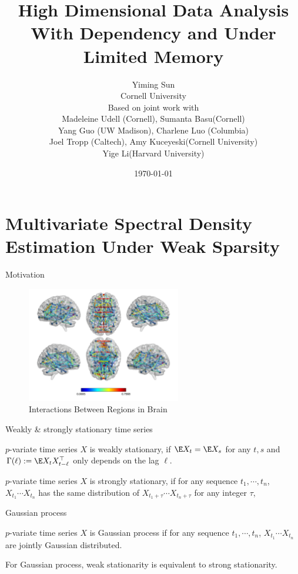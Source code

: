 \documentclass[handout,xcolor={usenames,dvipsnames}]{beamer}
\title{High Dimensional Data Analysis With Dependency and Under Limited Memory}
\date{\today} %
\author[Yiming Sun Cornell. \textit{}]{%
Yiming Sun\\[1ex]
{Cornell University}\\
\vspace{.4in}
Based on joint work with \\
Madeleine Udell (Cornell), Sumanta Basu(Cornell)\\
Yang Guo (UW Madison),  Charlene Luo (Columbia)\\
Joel Tropp (Caltech), Amy Kuceyeski(Cornell University)\\
Yige Li(Harvard University)}
\begin{document}
\begin{frame}
\titlepage
\end{frame}

\section{Multivariate Spectral Density Estimation Under Weak Sparsity}
\begin{frame}{Motivation}
\begin{figure}
\centering 
\includegraphics[width=0.6\textwidth]{al_c.jpg}
\caption{Interactions Between Regions in Brain}
\end{figure}
\end{frame}

\begin{frame}{Weakly \& strongly stationary time series}
\begin{definition}
$p$-variate time series $X$ is weakly stationary, if $\E X_t = \E X_s$ for any $t, s$ and $\Gamma(\ell) := \E X_t X^\top_{t-\ell}$ only depends on the lag $\ell$.  
\end{definition} 
\begin{definition}
$p$-variate time series $X$ is strongly stationary, if for any sequence $t_1, \cdots, t_n$,  $X_{t_1} \cdots X_{t_n}$ has the same distribution of $X_{t_1+\tau} \cdots X_{t_n+\tau}$ for any integer $\tau$, 
\end{definition}
\end{frame}

\begin{frame}{Gaussian process}
\begin{definition}
$p$-variate time series $X$ is Gaussian process if for any sequence $t_1, \cdots, t_n$,  $X_{t_1} \cdots X_{t_n}$  are jointly Gaussian distributed. 
\end{definition}
For Gaussian process, weak stationarity is equivalent to strong stationarity. 
\end{frame}
\end{document}
